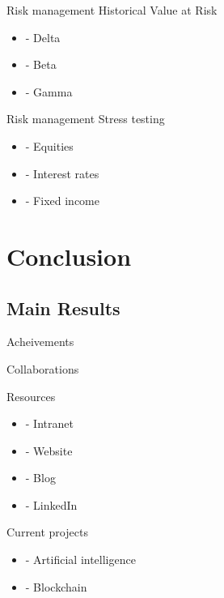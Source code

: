 \documentclass{beamer}
\begin{document}
\begin{frame}{Risk management}
Historical Value at Risk
  \begin{itemize}
  \item
- Delta 
  \item
- Beta 
  \item
- Gamma 
  \end{itemize}
\end{frame} 

\begin{frame}{Risk management}
Stress testing
  \begin{itemize}
  \item
- Equities 
  \item
- Interest rates 
  \item
- Fixed income 
  \end{itemize}
\end{frame} 

\section{Conclusion}

\subsection{Main Results}

\begin{frame}{Acheivements}
\end{frame}

\begin{frame}{Collaborations}
\end{frame}

\begin{frame}{Resources}
  \begin{itemize}
  \item
- Intranet
  \item
- Website
  \item
- Blog
  \item
- LinkedIn
  \end{itemize}
\end{frame}

\begin{frame}{Current projects}
  \begin{itemize}
  \item
- Artificial intelligence
  \item
- Blockchain
  \end{itemize}
\end{frame}
\end{document}
